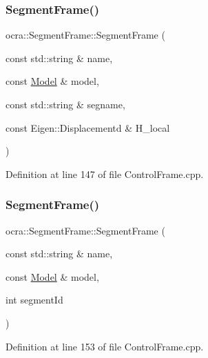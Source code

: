 \subsubsection{\texorpdfstring{Segment\+Frame()}{SegmentFrame()}\hspace{0.1cm}{\footnotesize\ttfamily [2/4]}}
{\footnotesize\ttfamily ocra\+::\+Segment\+Frame\+::\+Segment\+Frame (\begin{DoxyParamCaption}\item[{const std\+::string \&}]{name,  }\item[{const \hyperlink{classocra_1_1Model}{Model} \&}]{model,  }\item[{const std\+::string \&}]{segname,  }\item[{const Eigen\+::\+Displacementd \&}]{H\+\_\+local }\end{DoxyParamCaption})}



Definition at line 147 of file Control\+Frame.\+cpp.

\hypertarget{classocra_1_1SegmentFrame_a01156da94eca5bf4961077a3310fc271}{}\label{classocra_1_1SegmentFrame_a01156da94eca5bf4961077a3310fc271} 
\subsubsection{\texorpdfstring{Segment\+Frame()}{SegmentFrame()}\hspace{0.1cm}{\footnotesize\ttfamily [3/4]}}
{\footnotesize\ttfamily ocra\+::\+Segment\+Frame\+::\+Segment\+Frame (\begin{DoxyParamCaption}\item[{const std\+::string \&}]{name,  }\item[{const \hyperlink{classocra_1_1Model}{Model} \&}]{model,  }\item[{int}]{segment\+Id }\end{DoxyParamCaption})}



Definition at line 153 of file Control\+Frame.\+cpp.

\hypertarget{classocra_1_1SegmentFrame_a3864bc8263c40f7afa11de3c8c2dd76b}{}\label{classocra_1_1SegmentFrame_a3864bc8263c40f7afa11de3c8c2dd76b} 

